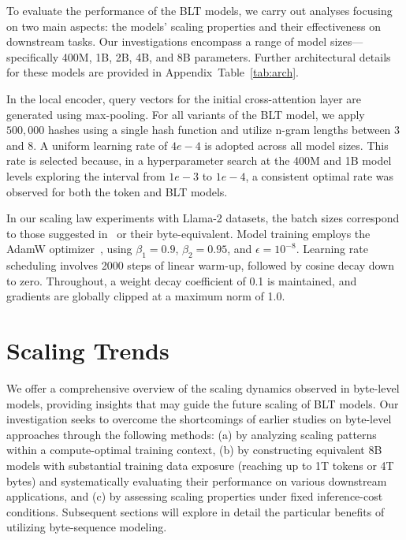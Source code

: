 To evaluate the performance of the {\textsc BLT} models, we carry out analyses focusing on two main aspects: the models’ scaling properties and their effectiveness on downstream tasks. Our investigations encompass a range of model sizes—specifically 400M, 1B, 2B, 4B, and 8B parameters. Further architectural details for these models are provided in Appendix~Table~\ref{tab:arch}.

In the local encoder, query vectors for the initial cross-attention layer are generated using max-pooling. For all variants of the {\textsc BLT} model, we apply $500,000$ hashes using a single hash function and utilize n-gram lengths between 3 and 8. A uniform learning rate of $4e-4$ is adopted across all model sizes. This rate is selected because, in a hyperparameter search at the 400M and 1B model levels exploring the interval from $1e-3$ to $1e-4$, a consistent optimal rate was observed for both the token and {\textsc BLT} models.

In our scaling law experiments with Llama-2 datasets, the batch sizes correspond to those suggested in~\cite{dubey2024llama} or their byte-equivalent. Model training employs the AdamW optimizer~\citep{adamw}, using $\beta_1=0.9$, $\beta_2=0.95$, and $\epsilon=10^{-8}$. Learning rate scheduling involves 2000 steps of linear warm-up, followed by cosine decay down to zero. Throughout, a weight decay coefficient of 0.1 is maintained, and gradients are globally clipped at a maximum norm of 1.0.

\section{Scaling Trends}
\label{section:scaling}

We offer a comprehensive overview of the scaling dynamics observed in byte-level models, providing insights that may guide the future scaling of {\textsc BLT} models. Our investigation seeks to overcome the shortcomings of earlier studies on byte-level approaches through the following methods: (a) by analyzing scaling patterns within a compute-optimal training context, (b) by constructing equivalent 8B models with substantial training data exposure (reaching up to 1T tokens or 4T bytes) and systematically evaluating their performance on various downstream applications, and (c) by assessing scaling properties under fixed inference-cost conditions. Subsequent sections will explore in detail the particular benefits of utilizing byte-sequence modeling.

